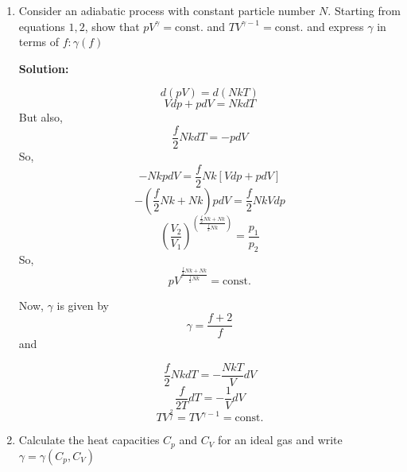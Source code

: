 \documentclass[10pt]{article}
\newenvironment{Solution}
    {\textbf{Solution:}
    
    \vspace{5mm}
    \begin{tcolorbox}
    }
    {
    \end{tcolorbox}
    \vspace{5mm}
    }
\begin{document}
\begin{enumerate}
\begin{enumerate}
\item Consider an adiabatic process with constant particle number $N$. Starting from equations $1,2$, show that $p V^{\gamma}=\text {const.}$ and $ T V^{\gamma-1}=\text {const.}$ and express $\gamma$ in terms of $f: \gamma(f)$

\begin{Solution}
\begin{equation}
    d\left( p V \right) = d \left( N k T\right)
\end{equation}
\begin{equation}
    V dp + p dV = NkdT
\end{equation}
But also, 
\begin{equation}
    \frac{f}{2}Nk dT = -p dV
\end{equation}
So, 
\begin{equation}
    {-{N k}p dV} = {\frac{f}{2}Nk}[{V dp + p dV}]
\end{equation}
\begin{equation}
-\left({\frac{f}{2}Nk}+{Nk}\right)p dV = \frac{f}{2}Nk V dp    
\end{equation}
\begin{equation}
    \left(\frac{V_2}{V_1}\right)^{\left(\frac{{\frac{f}{2}Nk}+{Nk}}{\frac{f}{2}Nk}\right)} = \frac{p_1}{p_2}
\end{equation}
So, 
\begin{equation}
   \boxed{ pV^{\frac{{\frac{f}{2}Nk}+{Nk}}{\frac{f}{2}Nk}} = \text{const.}}
\end{equation}

Now, $\gamma$ is given by
\begin{equation}
    \boxed{\gamma = {\frac{{f}+{2}}{f}}}
\end{equation}
and 

\begin{equation}
    \frac{f}{2}Nk dT = -\frac{NkT}{V} dV
\end{equation}
\begin{equation}
    \frac{f}{2T} dT = -\frac{1}{V} dV
\end{equation}
\begin{equation}
    \boxed{TV^\frac{2}{f} = TV^{\gamma-1} = \text{const.}}
\end{equation}

\end{Solution}
\newpage

\item Calculate the heat capacities $C_{p}$ and $C_{V}$ for an ideal gas and write $\gamma=\gamma\left(C_{p}, C_{V}\right)$


\end{enumerate}
\end{enumerate}
\end{document}
